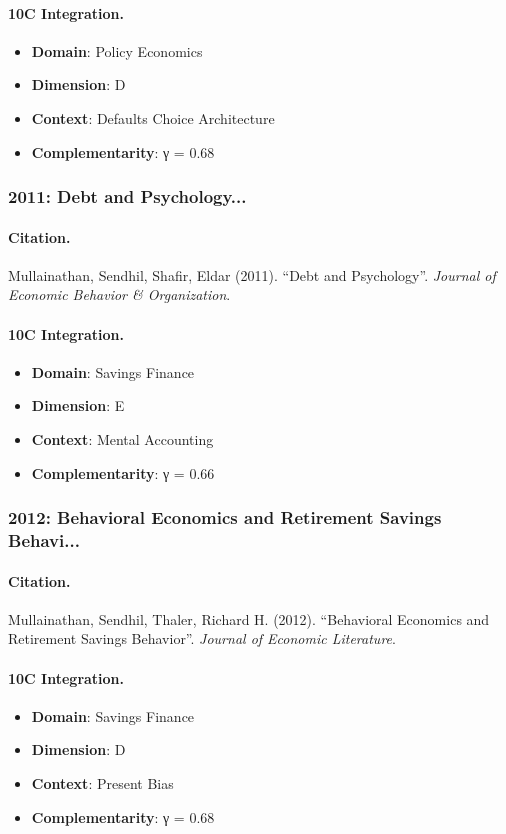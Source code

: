 \paragraph{10C Integration.}
\begin{itemize}[nosep]
  \item \textbf{Domain}: Policy Economics
  \item \textbf{Dimension}: D
  \item \textbf{Context}: Defaults Choice Architecture
  \item \textbf{Complementarity}: γ = 0.68
\end{itemize}


\subsubsection{2011: Debt and Psychology...}

\paragraph{Citation.}
Mullainathan, Sendhil, Shafir, Eldar (2011). ``Debt and Psychology''. \textit{Journal of Economic Behavior & Organization}.

\paragraph{10C Integration.}
\begin{itemize}[nosep]
  \item \textbf{Domain}: Savings Finance
  \item \textbf{Dimension}: E
  \item \textbf{Context}: Mental Accounting
  \item \textbf{Complementarity}: γ = 0.66
\end{itemize}


\subsubsection{2012: Behavioral Economics and Retirement Savings Behavi...}

\paragraph{Citation.}
Mullainathan, Sendhil, Thaler, Richard H. (2012). ``Behavioral Economics and Retirement Savings Behavior''. \textit{Journal of Economic Literature}.

\paragraph{10C Integration.}
\begin{itemize}[nosep]
  \item \textbf{Domain}: Savings Finance
  \item \textbf{Dimension}: D
  \item \textbf{Context}: Present Bias
  \item \textbf{Complementarity}: γ = 0.68
\end{itemize}


